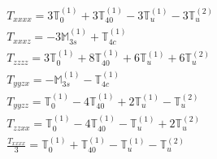 \documentclass[fleqn,8pt,landscape]{jsarticle}
\begin{document}
\begin{align*}
& T_{xxxx} = 3 \mathbb{T}_{0}^{(1)} + 3 \mathbb{T}_{40}^{(1)} - 3 \mathbb{T}_{u}^{(1)} - 3 \mathbb{T}_{u}^{(2)} \\
& T_{xxxz} = - 3 \mathbb{M}_{3s}^{(1)} + \mathbb{T}_{4c}^{(1)} \\
& T_{zzzz} = 3 \mathbb{T}_{0}^{(1)} + 8 \mathbb{T}_{40}^{(1)} + 6 \mathbb{T}_{u}^{(1)} + 6 \mathbb{T}_{u}^{(2)} \\
& T_{yyzx} = - \mathbb{M}_{3s}^{(1)} - \mathbb{T}_{4c}^{(1)} \\
& T_{yyzz} = \mathbb{T}_{0}^{(1)} - 4 \mathbb{T}_{40}^{(1)} + 2 \mathbb{T}_{u}^{(1)} - \mathbb{T}_{u}^{(2)} \\
& T_{zzxx} = \mathbb{T}_{0}^{(1)} - 4 \mathbb{T}_{40}^{(1)} - \mathbb{T}_{u}^{(1)} + 2 \mathbb{T}_{u}^{(2)} \\
& \frac{T_{xxxx}}{3} = \mathbb{T}_{0}^{(1)} + \mathbb{T}_{40}^{(1)} - \mathbb{T}_{u}^{(1)} - \mathbb{T}_{u}^{(2)}
\end{align*}
\end{document}
